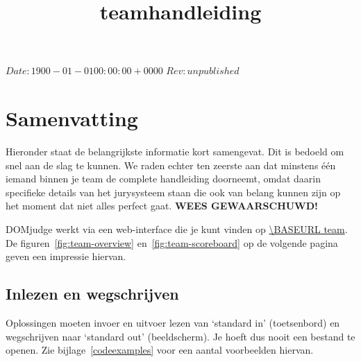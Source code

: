 

\usepackage[dutch]{babel}

\renewcommand{\versionrevison}{Versie/revisie}
\renewcommand{\lastmodified}{Laatst gewijzigd}
\renewcommand{\generated}{Gegenereerd}

\SVN $Date: 1900-01-01 00:00:00 +0000 $
\SVN $Rev: unpublished $

\title{\DOMjudge teamhandleiding}




\titlestuff{\DOMJUDGEVERSION}{\SVNRev}{\SVNDate}{\today}

\section*{Samenvatting}

Hieronder staat de belangrijkste informatie kort samengevat. Dit is
bedoeld om snel aan de slag te kunnen. We raden echter ten zeerste
aan dat minstens \'e\'en iemand binnen je team de complete handleiding
doorneemt, omdat daarin specifieke details van het jurysysteem staan
die ook van belang kunnen zijn op het moment dat niet alles perfect
gaat. \textbf{WEES GEWAARSCHUWD!}

DOMjudge werkt via een web-interface die je kunt vinden op
\url{\BASEURL team}. De figuren~\ref{fig:team-overview}
en~\ref{fig:team-scoreboard} op de volgende pagina geven een impressie
hiervan.

\subsection*{Inlezen en wegschrijven}

Oplossingen moeten invoer en uitvoer lezen van `standard in'
(toetsenbord) en wegschrijven naar `standard out' (beeldscherm). Je
hoeft dus nooit een bestand te openen. Zie bijlage~\ref{codeexamples}
voor een aantal voorbeelden hiervan.

